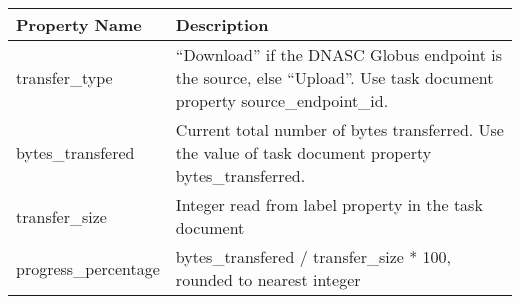 \begin{tabular}{p{4cm}p{6cm}}
\toprule
 Property Name       & Description                                                                                                              \\
\midrule
 transfer\_type       & ``Download'' if the DNASC Globus endpoint is the source, else ``Upload''. Use task document property source\_endpoint\_id. \\
 bytes\_transfered    & Current total number of bytes transferred. Use the value of task document property bytes\_transferred.                    \\
 transfer\_size       & Integer read from label property in the task document                                                                    \\
 progress\_percentage & bytes\_transfered / transfer\_size * 100, rounded to nearest integer                                                       \\
\bottomrule
\end{tabular}